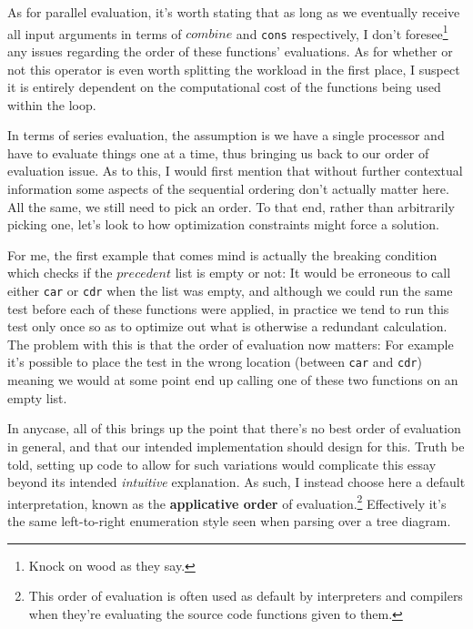 \documentclass[twoside]{article}
\newcommand{\strong}[1]{{\bfseries #1}}
\begin{document}
As for parallel evaluation, it's worth stating that as long as we eventually receive all input arguments in terms of
$ combine $ and \texttt{cons} respectively, I don't foresee\footnote{Knock on wood as they say.} any issues regarding
the order of these functions' evaluations. As for whether or not this operator is even worth splitting the workload in
the first place, I suspect it is entirely dependent on the computational cost of the functions being used within the loop.

In terms of series evaluation, the assumption is we have a single processor and have to evaluate things one at a time,
thus bringing us back to our order of evaluation issue. As to this, I would first mention that without further contextual
information some aspects of the sequential ordering don't actually matter here. All the same, we still need to pick an order.
To that end, rather than arbitrarily picking one, let's look to how optimization constraints might force a solution.

For me, the first example that comes mind is actually the breaking condition which checks if the $ precedent $ list is empty
or not: It would be erroneous to call either \texttt{car} or \texttt{cdr} when the list was empty, and although we could run
the same test before each of these functions were applied, in practice we tend to run this test only once so as to optimize
out what is otherwise a redundant calculation. The problem with this is that the order of evaluation now matters: For example
it's possible to place the test in the wrong location (between \texttt{car} and \texttt{cdr}) meaning we would at some point
end up calling one of these two functions on an empty list.

In anycase, all of this brings up the point that there's no best order of evaluation in general, and that our intended
implementation should design for this. Truth be told, setting up code to allow for such variations would complicate this
essay beyond its intended \emph{intuitive} explanation. As such, I instead choose here a default interpretation, known
as the \strong{applicative order} of evaluation.\footnote{This order of evaluation is often used as default by interpreters
and compilers when they're evaluating the source code functions given to them.} Effectively it's the same left-to-right
enumeration style seen when parsing over a tree diagram.
\end{document}
